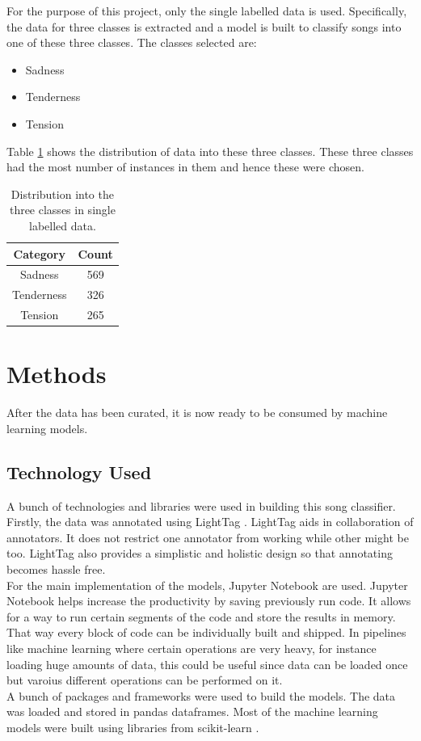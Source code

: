 \documentclass[11pt,a4paper]{article}
\begin{document}
For the purpose of this project, only the single labelled data is used. Specifically, the data for three classes is extracted and a model is built to classify songs into one of these three classes. The classes selected are:
\begin{itemize}
  \item Sadness
  \item Tenderness
  \item Tension
\end{itemize}
Table \ref{distribution} shows the distribution of data into these three classes. These three classes had the most number of instances in them and hence these were chosen.
\begin{table}[!htbp]
  \centering
  \caption{Distribution into the three classes in single labelled data.}
  \label{distribution}
  \begin{tabular}{|c|c|} \hline
  \textbf{Category} & \textbf{Count}\\ \hline
  Sadness & 569\\ \hline
  Tenderness & 326\\ \hline
  Tension & 265\\ \hline
  \end{tabular}
\end{table}


\section{Methods}
\label{methods}
After the data has been curated, it is now ready to be consumed by machine learning models.

\subsection{Technology Used}
\label{techstack}
A bunch of technologies and libraries were used in building this song classifier. Firstly, the data was annotated using LightTag \cite{lighttag}. LightTag aids in collaboration of annotators. It does not restrict one annotator from working while other might be too. LightTag also provides a simplistic and holistic design so that annotating becomes hassle free.\\
For the main implementation of the models, Jupyter Notebook \cite{jupyter} are used. Jupyter Notebook helps increase the productivity by saving previously run code. It allows for a way to run certain segments of the code and store the results in memory. That way every block of code can be individually built and shipped. In pipelines like machine learning where certain operations are very heavy, for instance loading huge amounts of data, this could be useful since data can be loaded once but varoius different operations can be performed on it.\\
A bunch of packages and frameworks were used to build the models. The data was loaded and stored in pandas \cite{pandas} dataframes. Most of the machine learning models were built using libraries from scikit-learn \cite{sklearn}.
\end{document}
